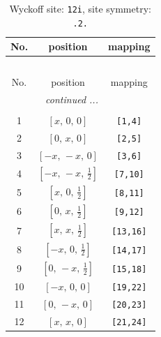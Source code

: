 \documentclass[fleqn,8pt]{jsarticle}
\begin{document}
\renewcommand{\arraystretch}{1.2}
\begin{longtable}{ccc}
\caption{Wyckoff site: {\tt 12i}, site symmetry: {\tt .2.}}
 \\
 \hline \hline
No. & position & mapping \\ \hline \endfirsthead

\multicolumn{2}{l}{\tablename\ \thetable{}} \\
 \hline \hline
No. & position & mapping \\ \hline \endhead

 \hline \hline
\multicolumn{2}{r}{\footnotesize\it continued ...} \\ \endfoot

 \hline \hline
\multicolumn{2}{r}{} \\ \endlastfoot

1 & $\left[ x,\, 0,\, 0 \right]$ & {\tt [1,4]} \\ \hline
2 & $\left[ 0,\, x,\, 0 \right]$ & {\tt [2,5]} \\ \hline
3 & $\left[ - x,\, - x,\, 0 \right]$ & {\tt [3,6]} \\ \hline
4 & $\left[ - x,\, - x,\, \frac{1}{2} \right]$ & {\tt [7,10]} \\ \hline
5 & $\left[ x,\, 0,\, \frac{1}{2} \right]$ & {\tt [8,11]} \\ \hline
6 & $\left[ 0,\, x,\, \frac{1}{2} \right]$ & {\tt [9,12]} \\ \hline
7 & $\left[ x,\, x,\, \frac{1}{2} \right]$ & {\tt [13,16]} \\ \hline
8 & $\left[ - x,\, 0,\, \frac{1}{2} \right]$ & {\tt [14,17]} \\ \hline
9 & $\left[ 0,\, - x,\, \frac{1}{2} \right]$ & {\tt [15,18]} \\ \hline
10 & $\left[ - x,\, 0,\, 0 \right]$ & {\tt [19,22]} \\ \hline
11 & $\left[ 0,\, - x,\, 0 \right]$ & {\tt [20,23]} \\ \hline
12 & $\left[ x,\, x,\, 0 \right]$ & {\tt [21,24]} \\
\end{longtable}
\renewcommand{\arraystretch}{1.2}
\end{document}
